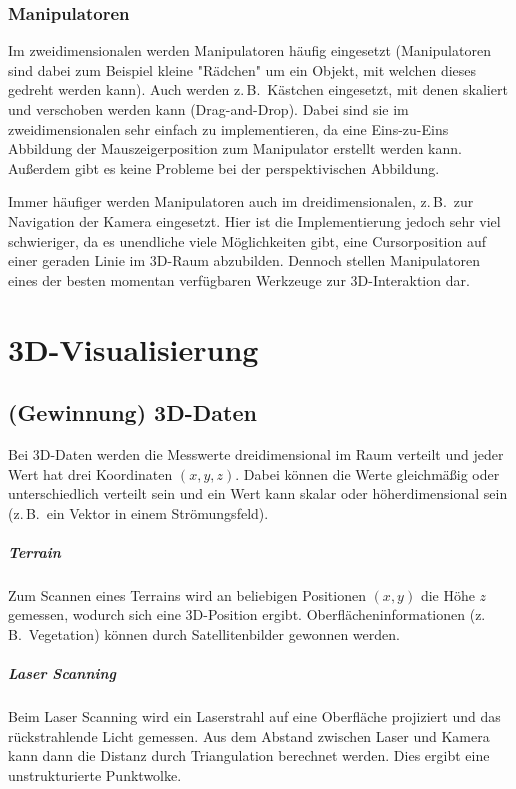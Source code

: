 \documentclass[a4paper, 11pt, accentcolor = tud3b]{tudreport}
\newcommand{\zB}{z.\,B.~}
\begin{document}
			\subsection{Manipulatoren}
				Im zweidimensionalen werden Manipulatoren häufig eingesetzt (Manipulatoren sind dabei zum Beispiel kleine "Rädchen" um ein Objekt, mit welchen dieses gedreht werden kann). Auch werden \zB Kästchen eingesetzt, mit denen skaliert und verschoben werden kann (Drag-and-Drop). Dabei sind sie im zweidimensionalen sehr einfach zu implementieren, da eine Eins-zu-Eins Abbildung der Mauszeigerposition zum Manipulator erstellt werden kann. Außerdem gibt es keine Probleme bei der perspektivischen Abbildung.
				
				Immer häufiger werden Manipulatoren auch im dreidimensionalen, \zB zur Navigation der Kamera eingesetzt. Hier ist die Implementierung jedoch sehr viel schwieriger, da es unendliche viele Möglichkeiten gibt, eine Cursorposition auf einer geraden Linie im 3D-Raum abzubilden. Dennoch stellen Manipulatoren eines der besten momentan verfügbaren Werkzeuge zur 3D-Interaktion dar.

	\chapter{3D-Visualisierung}
		\section{(Gewinnung) 3D-Daten}
			Bei 3D-Daten werden die Messwerte dreidimensional im Raum verteilt und jeder Wert hat drei Koordinaten \( (x, y, z) \). Dabei können die Werte gleichmäßig oder unterschiedlich verteilt sein und ein Wert kann skalar oder höherdimensional sein (\zB ein Vektor in einem Strömungsfeld).

			\paragraph{Terrain}
				Zum Scannen eines Terrains wird an beliebigen Positionen \( (x, y) \) die Höhe \(z\) gemessen, wodurch sich eine 3D-Position ergibt. Oberflächeninformationen (\zB Vegetation) können durch Satellitenbilder gewonnen werden.

			\paragraph{Laser Scanning}
				Beim Laser Scanning wird ein Laserstrahl auf eine Oberfläche projiziert und das rückstrahlende Licht gemessen. Aus dem Abstand zwischen Laser und Kamera kann dann die Distanz durch Triangulation berechnet werden. Dies ergibt eine unstrukturierte Punktwolke.
\end{document}
